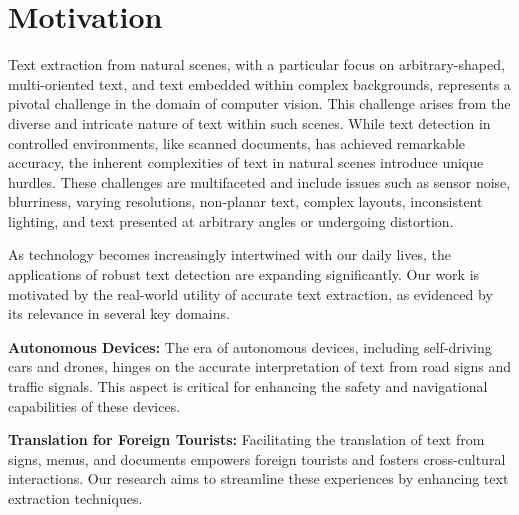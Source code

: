 

\section{Motivation}
Text extraction from natural scenes, with a particular focus on arbitrary-shaped, multi-oriented text, and text embedded within complex backgrounds, represents a pivotal challenge in the domain of computer vision. This challenge arises from the diverse and intricate nature of text within such scenes. While text detection in controlled environments, like scanned documents, has achieved remarkable accuracy, the inherent complexities of text in natural scenes introduce unique hurdles. These challenges are multifaceted and include issues such as sensor noise, blurriness, varying resolutions, non-planar text, complex layouts, inconsistent lighting, and text presented at arbitrary angles or undergoing distortion.

As technology becomes increasingly intertwined with our daily lives, the applications of robust text detection are expanding significantly. Our work is motivated by the real-world utility of accurate text extraction, as evidenced by its relevance in several key domains.

\textbf{Autonomous Devices:} The era of autonomous devices, including self-driving cars and drones, hinges on the accurate interpretation of text from road signs and traffic signals. This aspect is critical for enhancing the safety and navigational capabilities of these devices.

\textbf{Translation for Foreign Tourists:} Facilitating the translation of text from signs, menus, and documents empowers foreign tourists and fosters cross-cultural interactions. Our research aims to streamline these experiences by enhancing text extraction techniques.

